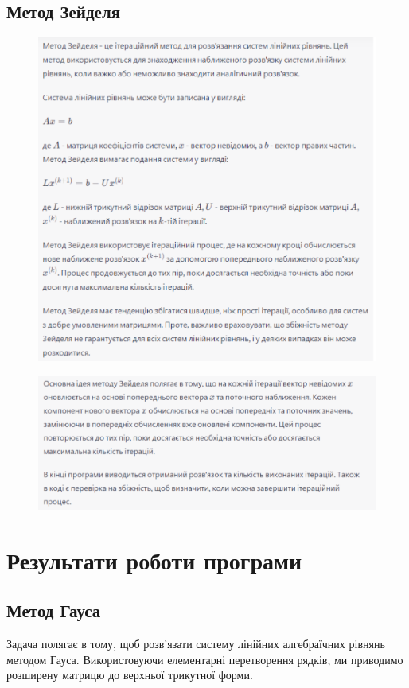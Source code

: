 \documentclass[a4paper, 12pt]{article}
\begin{document}
\clearpage
\newpage
\subsection{Метод Зейделя}

\begin{figure}[ht]
	\centering
	\includegraphics[width=0.8\linewidth]{seidel1.png}
\end{figure}
\begin{figure}[ht]
	\centering
	\includegraphics[width=0.8\linewidth]{seidel2.png}
\end{figure}

\newpage
\section{Результати роботи програми}

\subsection{Метод Гауса}
Задача полягає в тому, щоб розв'язати систему лінійних алгебраїчних рівнянь методом Гауса. Використовуючи елементарні перетворення рядків, ми приводимо розширену матрицю до верхньої трикутної форми.
\end{document}
